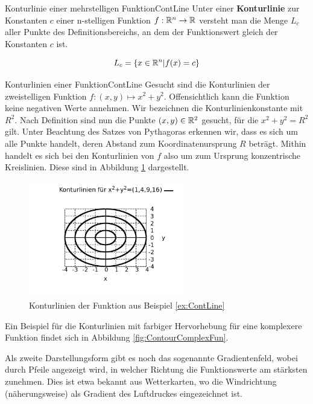 \begin{definition}{Konturlinie einer mehrstelligen Funktion}{ContLine}
    Unter einer \textbf{Konturlinie} zur Konstanten $c$ einer n-stelligen Funktion $f: \mathbb{R}^n\to\mathbb{R}$ versteht man die Menge $L_c$ aller Punkte des Definitionsbereichs, an dem der Funktionswert gleich der Konstanten $c$ ist.

    $$
       L_c = \lbrace x \in \mathbb{R}^n | f(x) = c \rbrace
    $$
\end{definition}

\begin{example}{Konturlinien einer Funktion}{ContLine}
    Gesucht sind die Konturlinien der zweistelligen Funktion $f: (x,y) \mapsto x^2+y^2$. Offensichtlich kann die Funktion keine negativen Werte annehmen. Wir bezeichnen die Konturlinienkonstante mit $R^2$. Nach Definition sind nun die Punkte $(x,y)\in\mathbb{R}^2$ gesucht, für die $x^2+y^2=R^2$ gilt. Unter Beachtung des Satzes von Pythagoras erkennen wir, dass es sich um alle Punkte handelt, deren Abstand zum Koordinatenursprung $R$ beträgt. Mithin handelt es sich bei den Konturlinien von $f$ also um zum Ursprung konzentrische Kreislinien. Diese sind in Abbildung \ref{fig:ExContLine} dargestellt.
\end{example}

\begin{figure}
    \centering
    \includegraphics[width=0.6\textwidth]{./gnuplot/example-contour-plot}
    \caption[Konturlinien einer zweistelligen Funktion]{Konturlinien der Funktion aus Beispiel \ref{ex:ContLine}}
    \label{fig:ExContLine}
\end{figure}

Ein Beispiel für die Konturlinien mit farbiger Hervorhebung für eine komplexere Funktion findet sich in Abbildung \ref{fig:ContourComplexFun}.

Als zweite Darstellungsform gibt es noch das sogenannte Gradientenfeld, wobei durch Pfeile angezeigt wird, in welcher Richtung die Funktionswerte am stärksten zunehmen. Dies ist etwa bekannt aus Wetterkarten, wo die Windrichtung (näherungsweise) als Gradient des Luftdruckes eingezeichnet ist.

